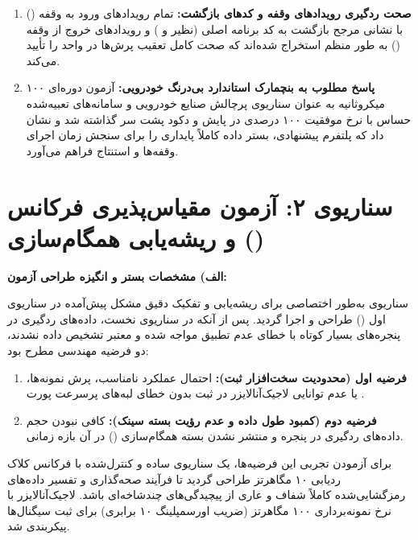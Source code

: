 \begin{enumerate}
    \item \textbf{صحت ردگیری رویدادهای وقفه و کدهای بازگشت:}
    تمام رویدادهای ورود به وقفه () با نشانی مرجح بازگشت به کد برنامه اصلی (نظیر  و ) و رویدادهای خروج از وقفه () به طور منظم استخراج شده‌اند که صحت کامل تعقیب پرش‌ها در واحد  را تأیید می‌کند.

    \item \textbf{پاسخ مطلوب به بنچمارک استاندارد بی‌درنگ خودرویی:}
    آزمون دوره‌ای ۱۰۰ میکروثانیه به عنوان سناریوی پرچالش صنایع خودرویی و سامانه‌های تعبیه‌شده حساس با نرخ موفقیت ۱۰۰ درصدی در پایش و دکود پشت سر گذاشته شد و نشان داد که پلتفرم پیشنهادی، بستر داده کاملاً پایداری را برای سنجش زمان اجرای وقفه‌ها و استنتاج  فراهم می‌آورد.
\end{enumerate}

\section[سناریوی ۲: آزمون مقیاس‌پذیری فرکانس و ریشه‌یابی همگام‌سازی (\lr{FreqTest})]{سناریوی ۲: آزمون مقیاس‌پذیری فرکانس\\ و ریشه‌یابی همگام‌سازی ()}
\label{sec:test_freqtest}

\noindent
\textbf{الف) مشخصات بستر و انگیزه طراحی آزمون:}\par
سناریوی  به‌طور اختصاصی برای ریشه‌یابی و تفکیک دقیق مشکل پیش‌آمده در سناریوی اول () طراحی و اجرا گردید. پس از آنکه در سناریوی نخست، داده‌های ردگیری در پنجره‌های بسیار کوتاه با خطای عدم تطبیق مواجه شده و معتبر تشخیص داده نشدند، دو فرضیه مهندسی مطرح بود:
\begin{enumerate}
    \item \textbf{فرضیه اول (محدودیت سخت‌افزار ثبت):} احتمال عملکرد نامناسب، پرش نمونه‌ها، یا عدم توانایی لاجیک‌آنالایزر در ثبت بدون خطای لبه‌های پرسرعت پورت .
    \item \textbf{فرضیه دوم (کمبود طول داده و عدم رؤیت بسته سینک):} کافی نبودن حجم داده‌های ردگیری در پنجره و منتشر نشدن بسته همگام‌سازی () در آن بازه زمانی.
\end{enumerate}

برای آزمودن تجربی این فرضیه‌ها، یک سناریوی ساده و کنترل‌شده با فرکانس کلاک ردیابی ۱۰ مگاهرتز طراحی گردید تا فرآیند صحه‌گذاری و تفسیر داده‌های رمزگشایی‌شده کاملاً شفاف و عاری از پیچیدگی‌های چندشاخه‌ای باشد. لاجیک‌آنالایزر با نرخ نمونه‌برداری ۱۰۰ مگاهرتز (ضریب اورسمپلینگ ۱۰ برابری) برای ثبت سیگنال‌ها پیکربندی شد.

